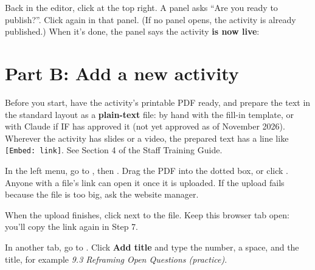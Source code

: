 Back in the editor, click  at the top right. A panel asks ``Are you ready to publish?''. Click  again in that panel. (If no panel opens, the activity is already published.)
When it's done, the panel says the activity \textbf{is now live}:

\newpage
\section*{Part B: Add a new activity}
\setcounter{wstep}{0}
Before you start, have the activity's printable PDF ready, and prepare the text in the standard layout as a \textbf{plain-text} file: by hand with the fill-in template, or with Claude if IF has approved it (not yet approved as of November 2026). Wherever the activity has slides or a video, the prepared text has a line like \texttt{[Embed: link]}. See Section 4 of the Staff Training Guide.

In the left menu, go to , then . Drag the PDF into the dotted box, or click . Anyone with a file's link can open it once it is uploaded. If the upload fails because the file is too big, ask the website manager.

When the upload finishes, click  next to the file. Keep this browser tab open: you'll copy the link again in Step 7.

In another tab, go to . Click \textbf{Add title} and type the number, a space, and the title, for example \textit{9.3 Reframing Open Questions (practice)}.

